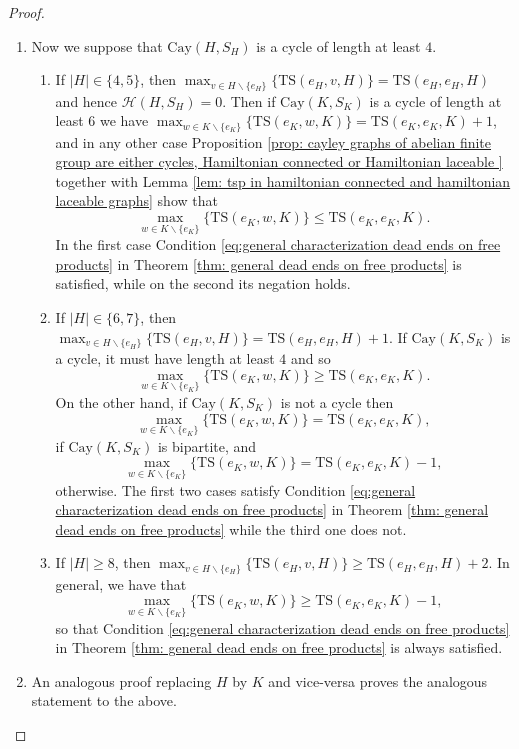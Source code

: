 \documentclass[reqno,oneside]{amsart}
\newcommand{\cay}[2]{\mathrm{Cay}(#1,#2)}
\newcommand{\TS}[3]{\mathrm{TS}\left(#1,#2,#3\right)}
\theoremstyle{plain}
\theoremstyle{definition}
\begin{document}
\begin{proof}
\begin{enumerate}
		\item Now we suppose that $\cay{H}{S_H}$ is a cycle of length at least $4$.
		\begin{enumerate}
			\item If $|H|\in \{4,5\}$, then $\max_{v\in H\backslash\{e_H\}}\Big\{\TS{e_H}{v}{H} \Big \}=\TS{e_H}{e_H}{H}$ and hence $\mathscr{H}(H,S_H)=0$. Then if $\cay{K}{S_K}$ is a cycle of length at least $6$ we have $\max_{w\in K\backslash\{e_K\}}\Big\{\TS{e_K}{w}{K} \Big\}= \TS{e_K}{e_K}{K}+1$, and in any other case Proposition \ref{prop: cayley graphs of abelian finite group are either cycles, Hamiltonian connected or Hamiltonian laceable } together with Lemma \ref{lem: tsp in hamiltonian connected and hamiltonian laceable graphs} show that $$\max_{w\in K\backslash\{e_K\}}\Big\{\TS{e_K}{w}{K} \Big\}\le \TS{e_K}{e_K}{K}.$$ In the first case Condition \eqref{eq:general characterization dead ends on free products} in Theorem \ref{thm: general dead ends on free products} is satisfied, while on the second its negation holds.
			
			\item If $|H|\in \{6,7\}$, then $\max_{v\in H\backslash\{e_H\}}\Big\{\TS{e_H}{v}{H} \Big \}=\TS{e_H}{e_H}{H}+1$. If $\cay{K}{S_K}$ is a cycle, it must have length at least $4$ and so
			$$
			\max_{w\in K\backslash\{e_K\}}\Big\{\TS{e_K}{w}{K} \Big\}\ge \TS{e_K}{e_K}{K}.
			$$
			On the other hand, if $\cay{K}{S_K}$ is not a cycle then
			$$
			\max_{w\in K\backslash\{e_K\}}\Big\{\TS{e_K}{w}{K} \Big\}= \TS{e_K}{e_K}{K},
			$$ if $\cay{K}{S_K}$ is bipartite, and 
			$$
			\max_{w\in K\backslash\{e_K\}}\Big\{\TS{e_K}{w}{K} \Big\}= \TS{e_K}{e_K}{K}-1,
			$$
			otherwise. The first two cases satisfy Condition \eqref{eq:general characterization dead ends on free products} in Theorem \ref{thm: general dead ends on free products} while the third one does not.
			
			\item If $|H|\ge 8$, then $\max_{v\in H\backslash\{e_H\}}\Big\{\TS{e_H}{v}{H} \Big \}\ge\TS{e_H}{e_H}{H}+2$. In general, we have that 
			$$
			\max_{w\in K\backslash\{e_K\}}\Big\{\TS{e_K}{w}{K} \Big\}\ge \TS{e_K}{e_K}{K}-1,
			$$
			so that Condition \eqref{eq:general characterization dead ends on free products} in Theorem \ref{thm: general dead ends on free products} is always satisfied.
		\end{enumerate}
		\item An analogous proof replacing $H$ by $K$ and vice-versa proves the analogous statement to the above.
	\end{enumerate}
\end{proof}
\end{document}

